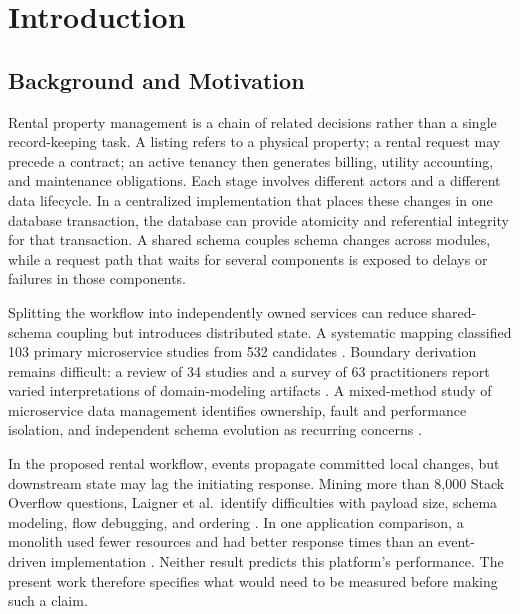 \section{Introduction}\label{sec:introduction}

\subsection{Background and Motivation}
Rental property management is a chain of related decisions rather than a single record-keeping task. A listing refers to a physical property; a rental request may precede a contract; an active tenancy then generates billing, utility accounting, and maintenance obligations. Each stage involves different actors and a different data lifecycle. In a centralized implementation that places these changes in one database transaction, the database can provide atomicity and referential integrity for that transaction. A shared schema couples schema changes across modules, while a request path that waits for several components is exposed to delays or failures in those components.

Splitting the workflow into independently owned services can reduce shared-schema coupling but introduces distributed state. A systematic mapping classified 103 primary microservice studies from 532 candidates \cite{dipfrancesco2019architecting}. Boundary derivation remains difficult: a review of 34 studies and a survey of 63 practitioners report varied interpretations of domain-modeling artifacts \cite{zhong2024ddd}. A mixed-method study of microservice data management identifies ownership, fault and performance isolation, and independent schema evolution as recurring concerns \cite{laigner2021datamanagement}.

In the proposed rental workflow, events propagate committed local changes, but downstream state may lag the initiating response. Mining more than 8,000 Stack Overflow questions, Laigner et al.\ identify difficulties with payload size, schema modeling, flow debugging, and ordering \cite{laigner2026eventmanagement}. In one application comparison, a monolith used fewer resources and had better response times than an event-driven implementation \cite{cabane2024edaperformance}. Neither result predicts this platform's performance. The present work therefore specifies what would need to be measured before making such a claim.


